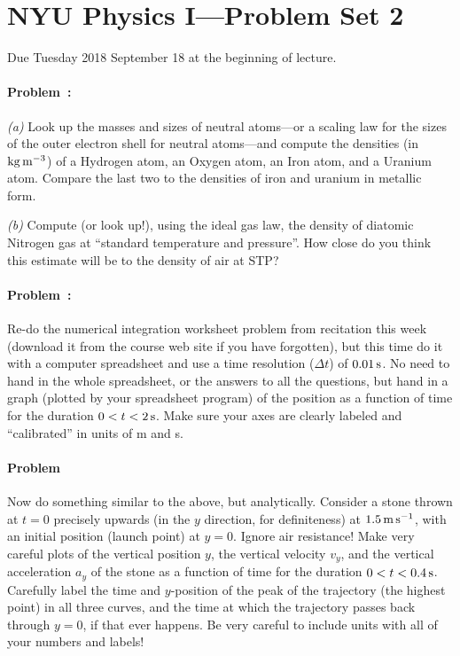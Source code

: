 \documentclass[12pt]{article}
\begin{document}
\section*{NYU Physics I---Problem Set 2}

Due Tuesday 2018 September 18 at the beginning of lecture.

\paragraph{Problem~\theproblem:}%
\textsl{(a)} Look up the masses and sizes of neutral atoms---or a
scaling law for the sizes of the outer electron shell for neutral
atoms---and compute the densities (in $\mathrm{kg}\,\mathrm{m}^{-3}$) of a Hydrogen
atom, an Oxygen atom, an Iron atom, and a Uranium atom. Compare the
last two to the densities of iron and uranium in metallic form.

\textsl{(b)} Compute (or look up!), using the ideal gas law, the
density of diatomic Nitrogen gas at ``standard temperature and
pressure''. How close do you think this estimate will be to the
density of air at STP?

\paragraph{Problem~\theproblem:}%
Re-do the numerical integration worksheet problem from recitation this
week (download it from the course web site if you have forgotten), but
this time do it with a computer spreadsheet and use a time resolution
($\Delta t$) of $0.01\,\mathrm{s}$.  No need to hand in the whole spreadsheet,
or the answers to all the questions, but hand in a graph (plotted by
your spreadsheet program) of the position as a function of time for
the duration $0<t<2\,\mathrm{s}$.  Make sure your axes are clearly labeled and
``calibrated'' in units of m and s.

\paragraph{Problem~\theproblem}%
Now do something similar to the above, but analytically.  Consider a
stone thrown at $t=0$ precisely upwards (in the $y$ direction, for
definiteness) at $1.5\,\mathrm{m}\,\mathrm{s}^{-1}$, with an initial position (launch point)
at $y=0$.  Ignore air resistance!  Make very careful plots of the
vertical position $y$, the vertical velocity $v_y$, and the vertical
acceleration $a_y$ of the stone as a function of time for the duration
$0<t<0.4\,\mathrm{s}$.  Carefully label the time and $y$-position of
the peak of the trajectory (the highest point) in all three curves,
and the time at which the trajectory passes back through $y=0$, if
that ever happens. Be very careful to include units with all of your
numbers and labels!
\end{document}
